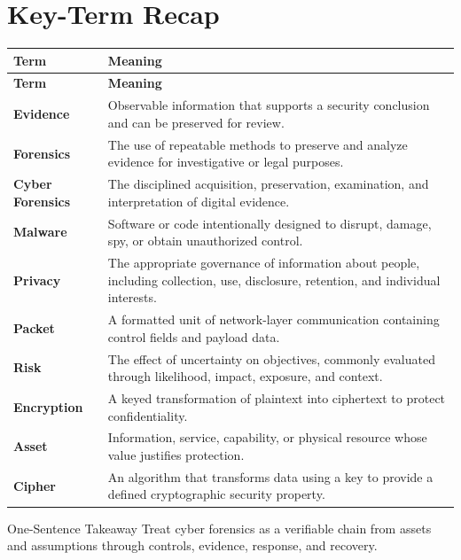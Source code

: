 \documentclass[11pt,letterpaper]{article}
\begin{document}
\section*{Key-Term Recap}
\begin{longtable}{>{\raggedright\arraybackslash}p{}>{\raggedright\arraybackslash}p{}}
\toprule\rowcolor{Navy}\color{white}\textbf{Term} & \color{white}\textbf{Meaning}\\\midrule
\endfirsthead
\toprule\rowcolor{Navy}\color{white}\textbf{Term} & \color{white}\textbf{Meaning}\\\midrule
\endhead
\textbf{Evidence} & Observable information that supports a security conclusion and can be preserved for review. \\\midrule
\textbf{Forensics} & The use of repeatable methods to preserve and analyze evidence for investigative or legal purposes. \\\midrule
\textbf{Cyber Forensics} & The disciplined acquisition, preservation, examination, and interpretation of digital evidence. \\\midrule
\textbf{Malware} & Software or code intentionally designed to disrupt, damage, spy, or obtain unauthorized control. \\\midrule
\textbf{Privacy} & The appropriate governance of information about people, including collection, use, disclosure, retention, and individual interests. \\\midrule
\textbf{Packet} & A formatted unit of network-layer communication containing control fields and payload data. \\\midrule
\textbf{Risk} & The effect of uncertainty on objectives, commonly evaluated through likelihood, impact, exposure, and context. \\\midrule
\textbf{Encryption} & A keyed transformation of plaintext into ciphertext to protect confidentiality. \\\midrule
\textbf{Asset} & Information, service, capability, or physical resource whose value justifies protection. \\\midrule
\textbf{Cipher} & An algorithm that transforms data using a key to provide a defined cryptographic security property. \\\midrule
\bottomrule
\end{longtable}
\begin{CornellExamBox}{One-Sentence Takeaway}
Treat cyber forensics as a verifiable chain from assets and assumptions through controls, evidence, response, and recovery.
\end{CornellExamBox}
\end{document}
